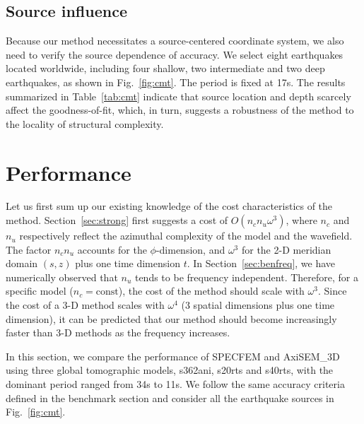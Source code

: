\documentclass[extra,referee]{gji}
\begin{document}
\subsection{Source influence}
\label{sec:bensrc}
Because our method necessitates a source-centered coordinate 
system, we also need to verify the source dependence of accuracy. 
We select eight earthquakes located worldwide, including four shallow, 
two intermediate and two deep earthquakes, as shown in Fig.~\ref{fig:cmt}.
The period is fixed at 17s. The results summarized in Table~\ref{tab:cmt}
indicate that source location and depth scarcely affect the goodness-of-fit,
which, in turn, suggests a robustness of the method to the locality 
of structural complexity.


\section{Performance}
\label{sec:perf}
Let us first sum up our existing knowledge of the cost characteristics of 
the method. Section~\ref{sec:strong} first suggests a cost of 
$O\left(n_c n_u \omega^3\right)$, where $n_c$ and $n_u$ respectively reflect the 
azimuthal complexity of the model and the wavefield.
The factor $n_c n_u$ accounts for the $\phi$-dimension, 
and $\omega^3$ for the 2-D meridian domain $\left(s,z\right)$ 
plus one time dimension $t$. 
In Section~\ref{sec:benfreq}, we have numerically observed that $n_u$ tends to
be frequency independent. 
Therefore, for a specific model ($n_c=\text{const}$), 
the cost of the method should scale with $\omega^3$. 
Since the cost of a 3-D method scales with $\omega^4$
(3 spatial dimensions plus one time dimension), it can be predicted that 
our method should become increasingly faster than 
3-D methods as the frequency increases.

In this section, we compare the performance of SPECFEM and AxiSEM\_3D
using three global tomographic models, s362ani, s20rts and s40rts, 
with the dominant period ranged from 34s to 11s. We follow the same 
accuracy criteria defined in the benchmark section and consider 
all the earthquake sources in Fig.~\ref{fig:cmt}.
 
\end{document}
